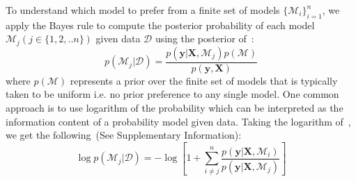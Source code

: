 To understand which model to prefer from a finite set of models  \(\bigl\{\mathcal{M}_i\bigr\}_{i=1}^n\), we apply the Bayes rule to compute the posterior probability of each model \(\mathcal{M}_{j}(j\in\{1,2,..n\})\) given data \(\mathcal{D}\) using the posterior of~: 
\begin{equation}
    p(\mathcal{M}_j\vert \mathcal{D}) = \frac{p(\textbf{y}\vert \textbf{X},\mathcal{M}_j)p(\mathcal{M})}{p(\textbf{y},\textbf{X})}
    \label{eq:postM}
\end{equation}
where \(p(\mathcal{M})\) represents a prior over the finite set of models that is typically taken to be uniform i.e. no prior preference to any single model. 
One common approach is to use logarithm of the probability which can be interpreted as the information content of a probability model given data. 
Taking the logarithm of~, we get the following~(See Supplementary Information): 
\begin{equation}
    \log p(\mathcal{M}_j\vert \mathcal{D}) = -\log \left [ 1+\sum_{i\neq j}^{n} \frac{p(\textbf{y}\vert \textbf{X},\mathcal{M}_i)}{p(\textbf{y}\vert \textbf{X},\mathcal{M}_j)}\right]
\label{eq:logPostM}
\end{equation}





